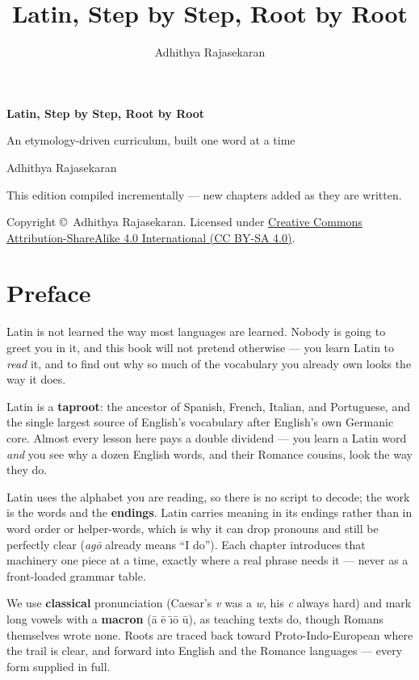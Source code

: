 \documentclass[11pt,twoside]{book}
\title{\Huge Latin, Step by Step, Root by Root}
\author{Adhithya Rajasekaran}
\date{}
\begin{document}
\frontmatter

\begin{titlepage}
  \centering
  \vspace*{3cm}
  {\Huge\bfseries Latin, Step by Step, Root by Root\par}
  \vspace{1cm}
  {\Large An etymology-driven curriculum, built one word at a time\par}
  \vspace{1.5cm}
  {\large Adhithya Rajasekaran\par}
  \vfill
  {\large This edition compiled incrementally --- new chapters added as they
  are written.\par}
  \vspace{2cm}
  {\normalsize
    Copyright \copyright\ Adhithya Rajasekaran. Licensed under
    \href{https://creativecommons.org/licenses/by-sa/4.0/}%
    {Creative Commons Attribution-ShareAlike 4.0 International (CC BY-SA 4.0)}.\par
  }
\end{titlepage}

\chapter*{Preface}

Latin is not learned the way most languages are learned. Nobody is going to
greet you in it, and this book will not pretend otherwise --- you learn Latin to
\emph{read} it, and to find out why so much of the vocabulary you already own
looks the way it does.

Latin is a \textbf{taproot}: the ancestor of Spanish, French, Italian, and
Portuguese, and the single largest source of English's vocabulary after
English's own Germanic core. Almost every lesson here pays a double dividend ---
you learn a Latin word \emph{and} you see why a dozen English words, and their
Romance cousins, look the way they do.

Latin uses the alphabet you are reading, so there is no script to decode; the
work is the words and the \textbf{endings}. Latin carries meaning in its endings
rather than in word order or helper-words, which is why it can drop pronouns and
still be perfectly clear (\textit{ag\=o} already means ``I do''). Each chapter
introduces that machinery one piece at a time, exactly where a real phrase needs
it --- never as a front-loaded grammar table.

We use \textbf{classical} pronunciation (Caesar's \textit{v} was a \emph{w},
his \textit{c} always hard) and mark long vowels with a \textbf{macron}
(\=a \=e \=\i \=o \=u), as teaching texts do, though Romans themselves wrote none.
Roots are traced back toward Proto-Indo-European where the trail is clear, and
forward into English and the Romance languages --- every form supplied in full.
\end{document}
